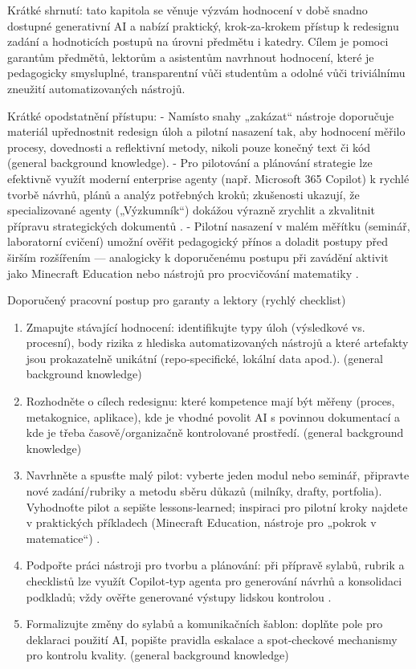 Krátké shrnutí: tato kapitola se věnuje výzvám hodnocení v době snadno dostupné generativní AI a nabízí praktický, krok‑za‑krokem přístup k redesignu zadání a hodnoticích postupů na úrovni předmětu i katedry. Cílem je pomoci garantům předmětů, lektorům a asistentům navrhnout hodnocení, které je pedagogicky smysluplné, transparentní vůči studentům a odolné vůči triviálnímu zneužití automatizovaných nástrojů.

Krátké opodstatnění přístupu:
- Namísto snahy „zakázat“ nástroje doporučuje materiál upřednostnit redesign úloh a pilotní nasazení tak, aby hodnocení měřilo procesy, dovednosti a reflektivní metody, nikoli pouze konečný text či kód (general background knowledge).  
- Pro pilotování a plánování strategie lze efektivně využít moderní enterprise agenty (např. Microsoft 365 Copilot) k rychlé tvorbě návrhů, plánů a analýz potřebných kroků; zkušenosti ukazují, že specializované agenty („Výzkumník“) dokážou výrazně zrychlit a zkvalitnit přípravu strategických dokumentů \cite{kb_ai_101_tipu_pdf_04e4a115_page_48_1}.  
- Pilotní nasazení v malém měřítku (seminář, laboratorní cvičení) umožní ověřit pedagogický přínos a doladit postupy před širším rozšířením — analogicky k doporučenému postupu při zavádění aktivit jako Minecraft Education nebo nástrojů pro procvičování matematiky \cite{kb_ai_101_tipu_pdf_04e4a115_page_15_2,kb_ai_101_tipu_pdf_04e4a115_page_8_1}.

Doporučený pracovní postup pro garanty a lektory (rychlý checklist)
\begin{enumerate}
  \item Zmapujte stávající hodnocení: identifikujte typy úloh (výsledkové vs. procesní), body rizika z hlediska automatizovaných nástrojů a které artefakty jsou prokazatelně unikátní (repo‑specifické, lokální data apod.). (general background knowledge)
  \item Rozhodněte o cílech redesignu: které kompetence mají být měřeny (proces, metakognice, aplikace), kde je vhodné povolit AI s povinnou dokumentací a kde je třeba časově/organizačně kontrolované prostředí. (general background knowledge)
  \item Navrhněte a spusťte malý pilot: vyberte jeden modul nebo seminář, připravte nové zadání/rubriky a metodu sběru důkazů (milníky, drafty, portfolia). Vyhodnoťte pilot a sepište lessons‑learned; inspiraci pro pilotní kroky najdete v praktických příkladech (Minecraft Education, nástroje pro „pokrok v matematice“) \cite{kb_ai_101_tipu_pdf_04e4a115_page_15_2,kb_ai_101_tipu_pdf_04e4a115_page_8_1}.
  \item Podpořte práci nástroji pro tvorbu a plánování: při přípravě sylabů, rubrik a checklistů lze využít Copilot‑typ agenta pro generování návrhů a konsolidaci podkladů; vždy ověřte generované výstupy lidskou kontrolou \cite{kb_ai_101_tipu_pdf_04e4a115_page_48_1}.
  \item Formalizujte změny do sylabů a komunikačních šablon: doplňte pole pro deklaraci použití AI, popište pravidla eskalace a spot‑checkové mechanismy pro kontrolu kvality. (general background knowledge)
\end{enumerate}

